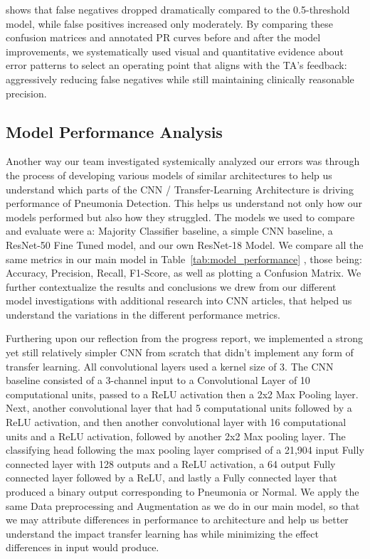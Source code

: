 \documentclass[11pt]{article}
\begin{document}
shows that false negatives dropped dramatically compared to the 0.5-threshold model, while false positives increased only moderately. By comparing these confusion matrices and annotated PR curves before and after the model improvements, we systematically used visual and quantitative evidence about error patterns to select an operating point that aligns with the TA’s feedback: aggressively reducing false negatives while still maintaining clinically reasonable precision.


\subsection{Model Performance Analysis}

Another way our team investigated systemically analyzed our errors was through the process of developing various models of similar architectures to help us understand which parts of the CNN / Transfer-Learning Architecture is driving performance of Pneumonia Detection. This helps us understand not only how our models performed but also how they struggled. The models we used to compare and evaluate were a: Majority Classifier baseline, a simple CNN baseline, a ResNet-50 Fine Tuned model, and our own ResNet-18 Model. We compare all the same metrics in our main model in Table~\ref{tab:model_performance} , those being: Accuracy, Precision, Recall, F1-Score, as well as plotting a Confusion Matrix. We further contextualize the results and conclusions we drew from our different model investigations with additional research into CNN articles, that helped us understand the variations in the different performance metrics. 


Furthering upon our reflection from the progress report, we implemented a strong yet still relatively simpler CNN from scratch that didn’t implement any form of transfer learning. All convolutional layers used a kernel size of 3. The CNN baseline consisted of a 3-channel input to a Convolutional Layer of 10 computational units, passed to a ReLU activation then a 2x2 Max Pooling layer. Next, another convolutional layer that had 5 computational units followed by a ReLU activation, and then another convolutional layer with 16 computational units and a ReLU activation, followed by another 2x2 Max pooling layer. The classifying head following the max pooling layer comprised of a 21,904 input Fully connected layer with 128 outputs and a ReLU activation, a 64 output Fully connected layer followed by a ReLU, and lastly a Fully connected layer that produced a binary output corresponding to Pneumonia or Normal. We apply the same Data preprocessing and Augmentation as we do in our main model, so that we may attribute differences in performance to architecture and help us better understand the impact transfer learning has while minimizing the effect differences in input would produce. 
\end{document}
